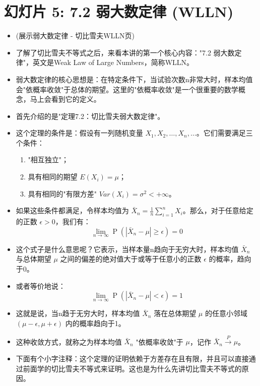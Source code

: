 \documentclass[UTF8]{article} %
\DeclareMathOperator{\Prob}{\operatorname{P}}
\begin{document}
\section*{幻灯片 5: 7.2 弱大数定律 (WLLN)}
\begin{itemize}
    \itemsep1em
    \item (展示弱大数定律 - 切比雪夫WLLN页)
    \item 了解了切比雪夫不等式之后，来看本讲的第一个核心内容："7.2 弱大数定律"，英文是Weak Law of Large Numbers，简称WLLN。
    \item 弱大数定律的核心思想是：在特定条件下，当试验次数n非常大时，样本均值会"依概率收敛"于总体的期望。这里的"依概率收敛"是一个很重要的数学概念，马上会看到它的定义。
    \item 首先介绍的是"定理7.2：切比雪夫弱大数定律"。
    \item 这个定理的条件是：假设有一列随机变量 $X_1, X_2, \dots, X_n, \dots$。它们需要满足三个条件：
    \begin{enumerate}[label=(\roman*), itemsep=0.3em]
        \item "相互独立"；
        \item 具有相同的期望 $E(X_i) = \mu$；
        \item 具有相同的"有限方差" $Var(X_i) = \sigma^2 < +\infty$。
    \end{enumerate}
    \item 如果这些条件都满足，令样本均值为 $\bar{X}_n = \frac{1}{n} \sum_{i=1}^{n} X_i$。那么，对于任意给定的正数 $\epsilon > 0$，我们有：
    \[ \lim_{n \to \infty} \Prob(|\bar{X}_n - \mu| \geq \epsilon) = 0 \]
    \item 这个式子是什么意思呢？它表示，当样本量n趋向于无穷大时，样本均值 $\bar{X}_n$ 与总体期望 $\mu$ 之间的偏差的绝对值大于或等于任意小的正数 $\epsilon$ 的概率，趋向于0。
    \item 或者等价地说：
    \[ \lim_{n \to \infty} \Prob(|\bar{X}_n - \mu| < \epsilon) = 1 \]
    \item 这就是说，当n趋于无穷大时，样本均值 $\bar{X}_n$ 落在总体期望 $\mu$ 的任意小邻域 $(\mu-\epsilon, \mu+\epsilon)$ 内的概率趋向于1。
    \item 这种收敛方式，就称之为样本均值 $\bar{X}_n$ "依概率收敛"于 $\mu$，记作 $\bar{X}_n \xrightarrow{P} \mu$。
    \item 下面有个小字注释：这个定理的证明依赖于方差存在且有限，并且可以直接通过前面学的切比雪夫不等式来证明。这也是为什么先讲切比雪夫不等式的原因。
\end{itemize}
\end{document}
